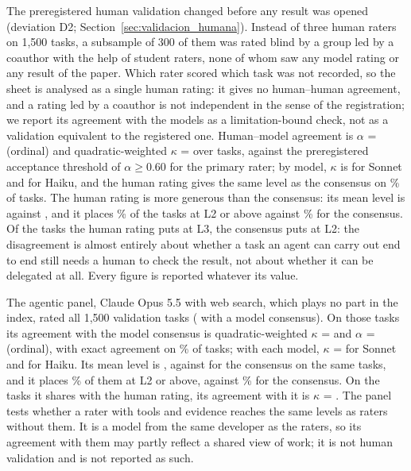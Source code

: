 The preregistered human validation changed before any result was opened (deviation D2; Section~\ref{sec:validacion_humana}).
Instead of three human raters on 1,500 tasks, a subsample of 300 of them was rated blind by a group led by a coauthor with the help of student raters, none of whom saw any model rating or any result of the paper.
Which rater scored which task was not recorded, so the sheet is analysed as a single human rating: it gives no human--human agreement, and a rating led by a coauthor is not independent in the sense of the registration; we report its agreement with the models as a limitation-bound check, not as a validation equivalent to the registered one.
Human--model agreement is $\alpha$ =  (ordinal) and quadratic-weighted $\kappa$ =  over  tasks, against the preregistered acceptance threshold of $\alpha \geq 0.60$ for the primary rater; by model, $\kappa$ is  for Sonnet and  for Haiku, and the human rating gives the same level as the consensus on \% of tasks.
The human rating is more generous than the consensus: its mean level is  against , and it places \% of the tasks at L2 or above against \% for the consensus.
Of the  tasks the human rating puts at L3, the consensus puts  at L2: the disagreement is almost entirely about whether a task an agent can carry out end to end still needs a human to check the result, not about whether it can be delegated at all.
Every figure is reported whatever its value.

The agentic panel, Claude Opus 5.5 with web search, which plays no part in the index, rated all 1,500 validation tasks ( with a model consensus).
On those tasks its agreement with the model consensus is quadratic-weighted $\kappa$ =  and $\alpha$ =  (ordinal), with exact agreement on \% of tasks; with each model, $\kappa$ =  for Sonnet and  for Haiku.
Its mean level is , against  for the consensus on the same tasks, and it places \% of them at L2 or above, against \% for the consensus.
On the  tasks it shares with the human rating, its agreement with it is $\kappa$ = .
The panel tests whether a rater with tools and evidence reaches the same levels as raters without them.
It is a model from the same developer as the raters, so its agreement with them may partly reflect a shared view of work; it is not human validation and is not reported as such.

